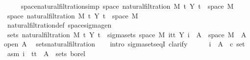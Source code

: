 \begin{isabellebody}
\ \ \ \ \ space{\isacharunderscore}{\kern0pt}natural{\isacharunderscore}{\kern0pt}filtration{\isacharbrackleft}{\kern0pt}simp{\isacharbrackright}{\kern0pt}{\isacharcolon}{\kern0pt}\ {\isachardoublequoteopen}space\ {\isacharparenleft}{\kern0pt}natural{\isacharunderscore}{\kern0pt}filtration\ M\ t\ Y\ t{\isacharparenright}{\kern0pt}\ {\isacharequal}{\kern0pt}\ space\ M{\isachardoublequoteclose}\isanewline
%
\isadelimproof
%
\endisadelimproof
%
\isatagproof
{}\isamarkupfalse%
\ {\isacharminus}{\kern0pt}\isanewline
\ \ \isamarkupfalse%
\ {\isachardoublequoteopen}space\ {\isacharparenleft}{\kern0pt}natural{\isacharunderscore}{\kern0pt}filtration\ M\ t\ Y\ t{\isacharparenright}{\kern0pt}\ {\isacharequal}{\kern0pt}\ space\ M{\isachardoublequoteclose}\ \isamarkupfalse%
\ natural{\isacharunderscore}{\kern0pt}filtration{\isacharunderscore}{\kern0pt}def\ space{\isacharunderscore}{\kern0pt}sigma{\isacharunderscore}{\kern0pt}gen\ \isacommand{{\isachardot}{\kern0pt}{\isachardot}{\kern0pt}}\isamarkupfalse%
\isanewline
\ \ \isamarkupfalse%
\ {\isachardoublequoteopen}sets\ {\isacharparenleft}{\kern0pt}natural{\isacharunderscore}{\kern0pt}filtration\ M\ t\ Y\ t{\isacharparenright}{\kern0pt}\ {\isacharequal}{\kern0pt}\ sigma{\isacharunderscore}{\kern0pt}sets\ {\isacharparenleft}{\kern0pt}space\ M{\isacharparenright}{\kern0pt}\ {\isacharparenleft}{\kern0pt}{\isasymUnion}i{\isasymin}{\isacharbraceleft}{\kern0pt}tt{\isacharbraceright}{\kern0pt}{\isachardot}{\kern0pt}\ {\isacharbraceleft}{\kern0pt}Y\ i\ {\isacharminus}{\kern0pt}{\isacharbackquote}{\kern0pt}\ A\ {\isasyminter}\ space\ M\ {\isacharbar}{\kern0pt}\ A{\isachardot}{\kern0pt}\ open\ A{\isacharbraceright}{\kern0pt}{\isacharparenright}{\kern0pt}{\isachardoublequoteclose}\ \isamarkupfalse%
\ sets{\isacharunderscore}{\kern0pt}natural{\isacharunderscore}{\kern0pt}filtration{\isacharprime}{\kern0pt}\isanewline
\ \ \isamarkupfalse%
\ {\isacharparenleft}{\kern0pt}intro\ sigma{\isacharunderscore}{\kern0pt}sets{\isacharunderscore}{\kern0pt}eqI{\isacharcomma}{\kern0pt}\ clarify{\isacharparenright}{\kern0pt}\isanewline
\ \ \ \ \isamarkupfalse%
\ i\ \ A\ {\isacharcolon}{\kern0pt}{\isacharcolon}{\kern0pt}\ {\isachardoublequoteopen}{\isacharprime}{\kern0pt}c\ set{\isachardoublequoteclose}\ \isamarkupfalse%
\ asm{\isacharcolon}{\kern0pt}\ {\isachardoublequoteopen}i\ {\isasymin}\ {\isacharbraceleft}{\kern0pt}tt{\isacharbraceright}{\kern0pt}{\isachardoublequoteclose}\ {\isachardoublequoteopen}\ A\ {\isasymin}\ sets\ borel{\isachardoublequoteclose}\isanewline

\end{isabellebody}
